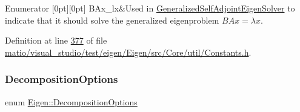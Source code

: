\begin{DoxyEnumFields}{Enumerator}
[0pt][0pt]{}\mbox{\label{group__enums_ggae3e239fb70022eb8747994cf5d68b4a9a5b64c528c90483f0b716018cad0143f8}} 
B\+Ax\+\_\+lx&Used in \hyperlink{group___eigenvalues___module_class_eigen_1_1_generalized_self_adjoint_eigen_solver}{Generalized\+Self\+Adjoint\+Eigen\+Solver} to indicate that it should solve the generalized eigenproblem $ BAx = \lambda x $. \\
\hline

\end{DoxyEnumFields}


Definition at line \hyperlink{matio_2visual__studio_2test_2eigen_2_eigen_2src_2_core_2util_2_constants_8h_source_l00377}{377} of file \hyperlink{matio_2visual__studio_2test_2eigen_2_eigen_2src_2_core_2util_2_constants_8h_source}{matio/visual\+\_\+studio/test/eigen/\+Eigen/src/\+Core/util/\+Constants.\+h}.

\mbox{\label{group__enums_gae3e239fb70022eb8747994cf5d68b4a9}} 
\subsubsection{\texorpdfstring{Decomposition\+Options}{DecompositionOptions}\hspace{0.1cm}{\footnotesize\ttfamily [2/2]}}
{\footnotesize\ttfamily enum \hyperlink{group__enums_gae3e239fb70022eb8747994cf5d68b4a9}{Eigen\+::\+Decomposition\+Options}}

